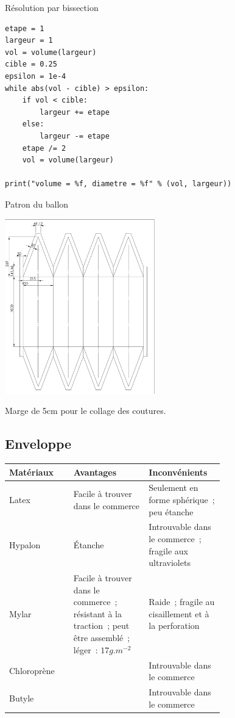 \begin{frame}[fragile]{Résolution par bissection}
  \begin{lstlisting}[frame=single]
etape = 1
largeur = 1
vol = volume(largeur)
cible = 0.25
epsilon = 1e-4
while abs(vol - cible) > epsilon:
	if vol < cible:
		largeur += etape
	else:
		largeur -= etape
	etape /= 2
	vol = volume(largeur)

print("volume = %f, diametre = %f" % (vol, largeur))
  \end{lstlisting}
\end{frame}

\begin{frame}{Patron du ballon}
  \begin{center}
    \includegraphics[width=6.5cm, angle=270]{../Images/plan_ballon.png}
  \end{center}
  Marge de 5cm pour le collage des coutures.
\end{frame}

\subsection{Enveloppe}

\begin{frame}
	\begin{tabular}{|l|p{0.35\linewidth}|p{0.35\linewidth}|}
		\hline
		Matériaux & Avantages & Inconvénients \\
		\hline

		\rowcolor{OrangeT}
		Latex &
		Facile à trouver dans le commerce &
		Seulement en forme sphérique~; peu étanche \\
		\hline

		\rowcolor{RedT}
		Hypalon & Étanche & Introuvable dans le commerce~; fragile aux ultraviolets \\
		\hline

		\rowcolor{GreenT}
		Mylar &
		Facile à trouver dans le commerce~; résistant à la traction~; peut être assemblé~; léger~: $17 g.m^{-2}$ &
		Raide~; fragile au cisaillement et à la perforation \\
		\hline

		\rowcolor{RedT}
		Chloroprène &
		& Introuvable dans le commerce \\
		\hline

		\rowcolor{RedT}
		Butyle &
		& Introuvable dans le commerce \\
		\hline
	\end{tabular}
\end{frame}

